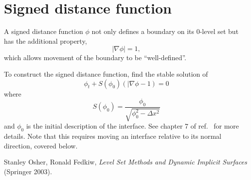\documentclass{article}
\newcommand{\be}{\begin{equation}}
\newcommand{\ee}{\end{equation}}
\newcommand{\grad}{\nabla}
\begin{document}
\section{Signed distance function}
A signed distance function $\phi$ not only defines a boundary on its 0-level set but has the additional property,
    \be |\grad\phi| = 1, \ee
which allows movement of the boundary to be ``well-defined''.

To construct the signed distance function, find the stable solution of 
    \be \phi_t + S(\phi_0)(|\grad\phi - 1) = 0 \ee
where
    \be S(\phi_0) = \frac{\phi_0}{\sqrt{\phi_0^2 - \Delta x^2}} \ee
and $\phi_0$ is the initial description of the interface. See chapter 7 of ref.~\cite{OF} for more details. Note that this requires moving an interface relative to its normal direction, covered below.

\begin{thebibliography}{99}
 Stanley Osher, Ronald Fedkiw, \emph{Level Set Methods and Dynamic Implicit Surfaces} (Springer 2003).
\end{thebibliography}
\end{document}
